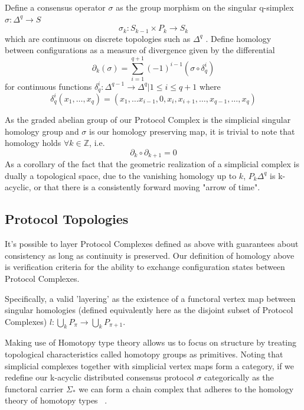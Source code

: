 \documentclass[runningheads]{llncs}
\begin{document}
Define a consensus operator $\sigma$ as the group morphism on the singular q-simplex $\sigma: \Delta^q \rightarrow S$ 
\begin{equation} \label{eq1}
\sigma_k: S_{k-1} \times P_k \rightarrow S_{k}
\end{equation} \label{eq1}
which are continuous on discrete topologies such as $\Delta^q$ \cite{ref_article1}. Define homology between configurations as a measure of divergence given by the differential 
\begin{equation} 
\partial_k(\sigma) = \sum^{q+1}_{i=1} (-1)^{i-1}(\sigma \circ \delta_q^{i} )
\end{equation}
for continuous functions $\delta^{i}_q: \Delta^{q-1} \rightarrow \Delta^q | 1 \leq i \leq q+1$ where 
\begin{equation}
\delta^{i}_q(x_1, \dots, x_q) = (x_1, \dots x_{i-1}, 0, x_i, x_{i+1}, \dots, x_{q-1}, \dots, x_q)
\end{equation}

As the graded abelian group of our Protocol Complex is the simplicial singular homology group and $\sigma$ is our homology preserving map, it is trivial to note that homology holds $\forall k \in \mathbb{Z}$, i.e.
\begin{equation} \label{eq1}
\partial_k \circ \partial_{k+1} = 0
\end{equation} \label{eq1}
As a corollary of the fact that the geometric realization of a simplicial complex is dually a topological space, due to the vanishing homology up to $k$, $P_k\Delta^q$ is k-acyclic, or that there is a consistently forward moving "arrow of time".

\subsection{Protocol Topologies}
It's possible to layer Protocol Complexes defined as above with guarantees about consistency as long as continuity is preserved. Our definition of homology above is verification criteria for the ability to exchange configuration states between Protocol Complexes.

Specifically, a valid 'layering' as the existence of a functoral vertex map between singular homologies (defined equivalently here as the disjoint subset of Protocol Complexes) $l: \bigcup_{k} P_{\pi} \rightarrow \bigcup_{k} P_{\pi+1}$.

Making use of Homotopy type theory allows us to focus on structure by treating topological characteristics called homotopy groups as primitives. Noting that simplicial complexes together with simplicial vertex maps form a category, if we redefine our k-acyclic distributed consensus protocol $\sigma$ categorically as the functoral carrier $\Sigma_{*}$  we can form a chain complex that adheres to the homology theory of homotopy types ~\cite{ref_article5}.
\end{document}
